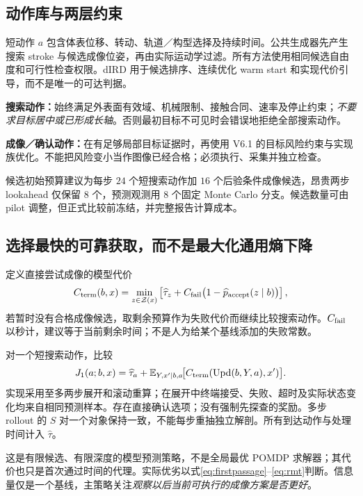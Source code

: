 \documentclass[UTF8,fontset=fandol,11pt,a4paper]{ctexart}
\theoremstyle{plain}
\theoremstyle{definition}
\theoremstyle{remark}
\numberwithin{equation}{section}
\newcommand{\E}{\mathbb E}
\newcommand{\cZ}{\mathcal Z}
\begin{document}
\subsection{动作库与两层约束}
短动作 $a$ 包含体表位移、转动、轨道／构型选择及持续时间。公共生成器先产生搜索 stroke 与候选成像位姿，再由实际运动学过滤。所有方法使用相同候选自由度和可行性检查权限。dIRD 用于候选排序、连续优化 warm start 和实现代价引导，而不是唯一的可达判据。

\textbf{搜索动作：}始终满足外表面有效域、机械限制、接触合同、速率及停止约束；\emph{不要求目标居中或已形成长轴}。否则最初目标不可见时会错误地拒绝全部搜索动作。

\textbf{成像／确认动作：}在有足够局部目标证据时，再使用 V6.1 的目标风险约束与实现族优化。不能把风险变小当作图像已经合格；必须执行、采集并独立检查。

候选初始预算建议为每步 $24$ 个短搜索动作加 $16$ 个后验条件成像候选，昂贵两步 lookahead 仅保留 $8$ 个，预测观测用 $8$ 个固定 Monte Carlo 分支。候选数量可由 pilot 调整，但正式比较前冻结，并完整报告计算成本。

\subsection{选择最快的可靠获取，而不是最大化通用熵下降}
定义直接尝试成像的模型代价
\begin{equation}
 C_{\rm term}(b,x)=\min_{z\in\cZ(x)}
 \left[\widehat\tau_z+C_{\rm fail}\bigl(1-\widehat p_{\rm accept}(z\mid b)\bigr)\right],
 \label{eq:terminal}
\end{equation}
若暂时没有合格成像候选，取剩余预算作为失败代价而继续比较搜索动作。$C_{\rm fail}$ 以秒计，建议等于当前剩余时间；不是人为给某个基线添加的失败常数。

对一个短搜索动作，比较
\begin{equation}
 J_1(a;b,x)=\widehat\tau_a+
 \E_{Y,x'\mid b,a}\!\big[C_{\rm term}(\operatorname{Upd}(b,Y,a),x')\big].
 \label{eq:lookahead}
\end{equation}
实现采用至多两步展开和滚动重算；在展开中终端接受、失败、超时及实际状态变化均来自相同预测样本。存在直接确认选项；没有强制先探查的奖励。多步 rollout 的 $S$ 对一个对象保持一致，不能每步重抽独立解剖。所有到达动作与处理时间计入 $\widehat\tau$。

这是有限候选、有限深度的模型预测策略，不是全局最优 POMDP 求解器；其代价也只是首次通过时间的代理。实际优劣以式\eqref{eq:firstpassage}--\eqref{eq:rmt}判断。信息量仅是一个基线，主策略关注\emph{观察以后当前可执行的成像方案是否更好}。
\end{document}
